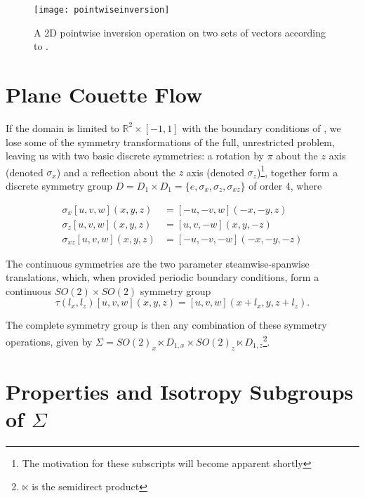 \begin{figure}[h]
\texttt{[image: pointwiseinversion]}
\caption{A 2D pointwise inversion operation on two sets of vectors according to .}\label{fig:pointwiseinversion}

\end{figure}


\section{Plane Couette Flow}

If the domain is limited to $\mathbb{R}^2 \times [-1,1]$ with the boundary conditions of \pCf, we lose some of the symmetry transformations of the full, unrestricted problem, leaving us with two basic discrete symmetries: a rotation by $\pi$ about the $z$ axis (denoted $\sigma_x$) and a reflection about the $z$ axis (denoted $\sigma_z$)\footnote{The motivation for these subscripts will become apparent shortly}, together form a discrete symmetry group $D = D_1 \times D_1 = \{e, \sigma_x,\sigma_z,\sigma_{xz}\}$ of order 4, where

\begin{align}\label{eq:discretesymm}
\sigma_x [u,v,w](x,y,z) &= [-u,-v,w](-x,-y,z)\\
\sigma_z [u,v,w](x,y,z) &= [u,v,-w](x,y,-z)\\
\sigma_{xz} [u,v,w](x,y,z) &= [-u,-v,-w](-x,-y,-z)
\end{align}

The continuous symmetries are the two parameter steamwise-spanwise translations, which, when provided periodic boundary conditions, form a continuous $SO(2)\times SO(2)$ symmetry group 
\begin{equation}\label{eq:contsymm}
\tau(l_x,l_z)[u,v,w](x,y,z) = [u,v,w](x+l_x,y,z+l_z).
\end{equation}

The complete symmetry group is then any combination of these symmetry operations, given by $\Sigma = SO(2)_x \ltimes D_{1,x} \times SO(2)_z \ltimes D_{1,z}$\footnote{$\ltimes$ is the semidirect product}. 
\section{Properties and Isotropy Subgroups of $\Sigma$}


